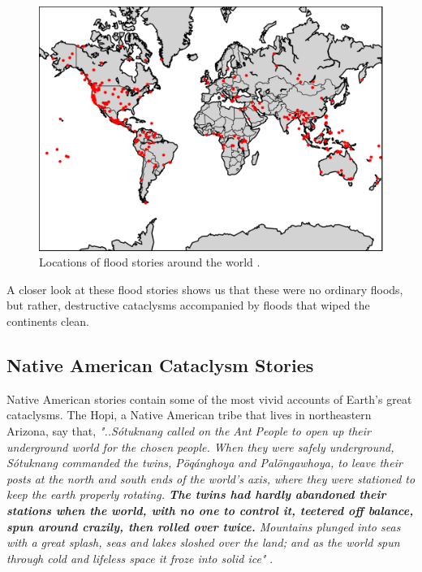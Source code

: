 \documentclass[10pt,twocolumn,letterpaper]{article}
\begin{document}
\begin{figure}[h]
\begin{center}
   \includegraphics[width=1\linewidth]{b.png}
\end{center}
   \caption{Locations of flood stories around the world \cite{3}.}
\label{fig:1}
\label{fig:onecol}
\end{figure}

A closer look at these flood stories shows us that these were no ordinary floods, but rather, destructive cataclysms accompanied by floods that wiped the continents clean.

\subsection{Native American Cataclysm Stories}

Native American stories contain some of the most vivid accounts of Earth's great cataclysms. The Hopi, a Native American tribe that lives in northeastern Arizona, say that, \textit{"..Sótuknang called on the Ant People to open up their underground world for the chosen people. When they were safely underground, Sótuknang commanded the twins, Pöqánghoya and Palöngawhoya, to leave their posts at the north and south ends of the world’s axis, where they were stationed to keep the earth properly rotating. \textbf{The twins had hardly abandoned their stations when the world, with no one to control it, teetered off balance, spun around crazily, then rolled over twice.} Mountains plunged into seas with a great splash, seas and lakes sloshed over the land; and as the world spun through cold and lifeless space it froze into solid ice"} \cite{4}.
\end{document}
